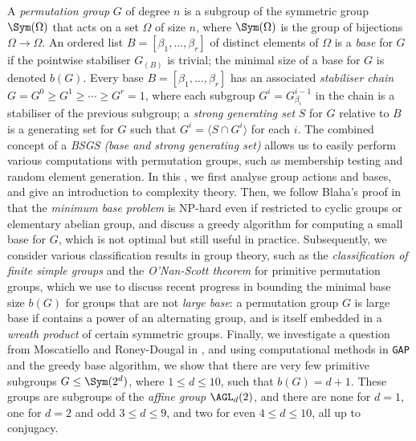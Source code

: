 A \textit{permutation group} $G$ of degree $n$ is a subgroup of the symmetric group $\Sym(\Omega)$ that acts on a set $\Omega$ of size $n$, where $\Sym(\Omega)$ is the group of bijections $\Omega \to \Omega$. An ordered list $B = [\beta_1,\dotsc,\beta_r]$ of distinct elements of $\Omega$ is a \textit{base} for $G$ if the pointwise stabiliser $G_{(B)}$ is trivial; the minimal size of a base for $G$ is denoted $b(G)$. Every base $B = [\beta_1,\dotsc,\beta_r]$ has an associated \textit{stabiliser chain} $G = G^0 \geq G^1 \geq \dotsb \geq G^r = 1$, where each subgroup $G^i = G^{i-1}_{\beta_i}$ in the chain is a stabiliser of the previous subgroup; a \textit{strong generating set} $S$ for $G$ relative to $B$ is a generating set for $G$ such that $G^i = \langle S \cap G^i \rangle$ for each $i$. The combined concept of a \textit{BSGS (base and strong generating set)} allows us to easily perform various computations with permutation groups, such as membership testing and random element generation. In this \thesis{}, we first analyse group actions and bases, and give an introduction to complexity theory. Then, we follow Blaha's proof in \cite{blaha1992} that the \textit{minimum base problem} is NP-hard even if restricted to cyclic groups or elementary abelian group, and discuss a greedy algorithm for computing a small base for $G$, which is not optimal but still useful in practice. Subsequently, we consider various classification results in group theory, such as the \textit{classification of finite simple groups} and the \textit{O'Nan-Scott theorem} for primitive permutation groups, which we use to discuss recent progress in bounding the minimal base size $b(G)$ for groups that are not \textit{large base}: a permutation group $G$ is large base if contains a power of an alternating group, and is itself embedded in a \textit{wreath product} of certain symmetric groups. Finally, we investigate a question from Moscatiello and Roney-Dougal in \cite{moscatiello_roney-dougal2021}, and using computational methods in \texttt{GAP} and the greedy base algorithm, we show that there are very few primitive subgroups $G \leq \Sym(2^d)$, where $1 \leq d \leq 10$, such that $b(G) = d + 1$. These groups are subgroups of the \textit{affine group} $\AGL_d(2)$, and there are none for $d = 1$, one for $d = 2$ and odd $3 \leq d \leq 9$, and two for even $4 \leq d \leq 10$, all up to conjugacy.